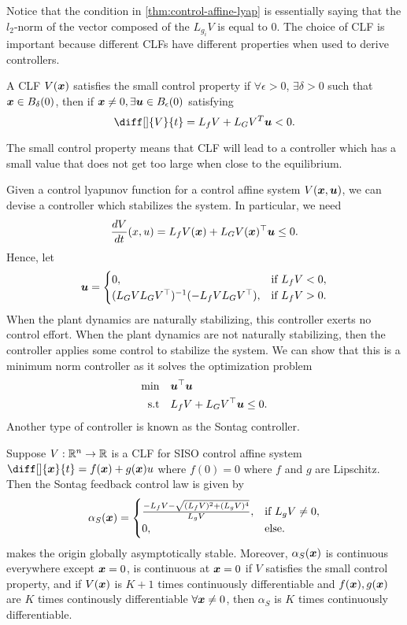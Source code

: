 Notice that the condition in \cref{thm:control-affine-lyap} is essentially
saying that the $l_2$-norm of the vector composed of the $L_{g_i} V$ is equal to
0. The choice of CLF is important because different CLFs have different
properties when used to derive controllers.
\begin{definition}
	A CLF $V(\boldsymbol{x})$ satisfies the small control property if $\forall \epsilon >
	0$, $\exists \delta > 0$ such that $\boldsymbol{x}\in B_\delta(0)$, then if
	$\boldsymbol{x}\neq0, \exists \boldsymbol{u}\in B_\epsilon(0)$ satisfying \[
		\diff[]{V}{t} = L_fV + L_GV^T\bs{u} < 0.
	\]
	\label{defn:small-control}
\end{definition}
The small control property means that CLF will lead to a controller which has a
small value that does not get too large when close to the equilibrium.

Given a control lyapunov function for a control affine system $V(\boldsymbol{x},
\boldsymbol{u})$, we can devise
a controller which stabilizes the system. In particular, we need \[
	\frac{dV}{dt}(x, u) = L_f V(\boldsymbol{x}) + L_GV(\boldsymbol{x})^\top \boldsymbol{u} \leq 0.
\]
Hence, let \[
	\boldsymbol{u} = \begin{cases}
		0, & \text{if } L_f V < 0,\\
		(L_GVL_GV^\top)^{-1}(-L_fV L_GV^\top), & \text{if } L_f V > 0.
	\end{cases}
\]
When the plant dynamics are naturally stabilizing, this controller exerts no
control effort. When the plant dynamics are not naturally stabilizing, then the
controller applies some control to stabilize the system. We can show that this
is a minimum norm controller as it solves the optimization problem \[
	\begin{aligned}
		\min &\quad \boldsymbol{u}^\top \boldsymbol{u}\\
		\text{s.t} &\quad L_fV + L_GV^\top \boldsymbol{u} \leq 0.
	\end{aligned}
\]
Another type of controller is known as the Sontag controller.
\begin{theorem}
	Suppose $V:\mathbb{R}^n\to\mathbb{R}$ is a CLF for SISO control affine system $\diff[]{\bs{x}}{t} =
	f(\bs{x}) + g(\bs{x})u$ where $f(0) = 0$ where $f$ and $g$ are Lipschitz. Then
	the Sontag feedback control law is given by \[
		\alpha_S(\boldsymbol{x}) = \begin{cases}
			\frac{-L_fV - \sqrt{(L_fV)^2 + (L_gV)^4}}{L_gV}, & \text{if } L_gV \neq
			0,\\
			0, & \text{else.}
		\end{cases}
	\]
	makes the origin globally asymptotically stable. Moreover,
	$\alpha_S(\boldsymbol{x})$ is continuous everywhere except $\boldsymbol{x} = 0$, is
	continuous at $\boldsymbol{x}=0$ if $V$ satisfies the small control property, and if
	$V(\boldsymbol{x})$ is $K+1$ times continuously differentiable and $f(\boldsymbol{x}),
	g(\boldsymbol{x})$ are $K$ times continously differentiable $\forall \boldsymbol{x}\neq0$,
	then $\alpha_S$ is $K$ times continuously differentiable.
	\label{thm:sontag}
\end{theorem}
